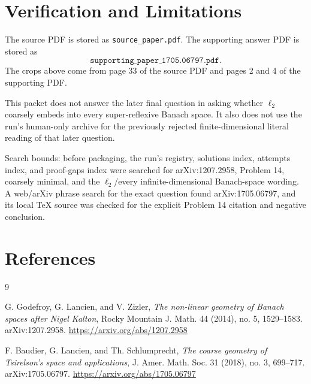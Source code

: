 \documentclass[11pt]{article}
\begin{document}
\section*{Verification and Limitations}

The source PDF is stored as \texttt{source\_paper.pdf}. The supporting answer
PDF is stored as
\[
\texttt{supporting\_paper\_1705.06797.pdf}.
\]
The crops above come from page 33 of the source PDF and pages 2 and 4 of the
supporting PDF.

This packet does not answer the later final question in \cite{BLS2017} asking
whether \(\ell_2\) coarsely embeds into every super-reflexive Banach space. It
also does not use the run's human-only archive for the previously rejected
finite-dimensional literal reading of that later question.

Search bounds: before packaging, the run's registry, solutions index, attempts
index, and proof-gaps index were searched for arXiv:1207.2958, Problem 14,
coarsely minimal, and the \(\ell_2\)/every infinite-dimensional Banach-space
wording. A web/arXiv phrase search for the exact question found
arXiv:1705.06797, and its local TeX source was checked for the explicit
Problem 14 citation and negative conclusion.

\section*{References}

\begin{thebibliography}{9}

G. Godefroy, G. Lancien, and V. Zizler,
\emph{The non-linear geometry of Banach spaces after Nigel Kalton},
Rocky Mountain J. Math. 44 (2014), no. 5, 1529--1583.
arXiv:1207.2958.
\url{https://arxiv.org/abs/1207.2958}

F. Baudier, G. Lancien, and Th. Schlumprecht,
\emph{The coarse geometry of Tsirelson's space and applications},
J. Amer. Math. Soc. 31 (2018), no. 3, 699--717.
arXiv:1705.06797.
\url{https://arxiv.org/abs/1705.06797}

\end{thebibliography}
\end{document}
